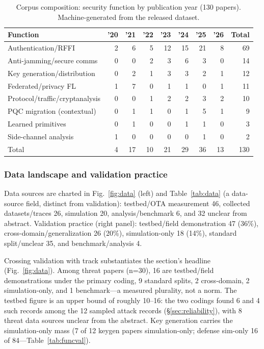 \begin{table}[tbp]
\centering
\caption{Corpus composition: security function by publication year (130 papers). Machine-generated from the released dataset.}
\label{tab:functions}
\begin{tabular}{lrrrrrrrr}
\toprule
Function & '20 & '21 & '22 & '23 & '24 & '25 & '26 & Total \\
\midrule
Authentication/RFFI & 2 & 6 & 5 & 12 & 15 & 21 & 8 & 69 \\
Anti-jamming/secure comms & 0 & 0 & 2 & 3 & 6 & 3 & 0 & 14 \\
Key generation/distribution & 0 & 2 & 1 & 3 & 3 & 2 & 1 & 12 \\
Federated/privacy FL & 1 & 7 & 0 & 1 & 1 & 0 & 1 & 11 \\
Protocol/traffic/cryptanalysis & 0 & 0 & 1 & 2 & 2 & 3 & 2 & 10 \\
PQC migration (contextual) & 0 & 1 & 1 & 0 & 1 & 5 & 1 & 9 \\
Learned primitives & 0 & 1 & 0 & 0 & 1 & 1 & 0 & 3 \\
Side-channel analysis & 1 & 0 & 0 & 0 & 0 & 1 & 0 & 2 \\
Total & 4 & 17 & 10 & 21 & 29 & 36 & 13 & 130 \\
\bottomrule
\end{tabular}
\end{table}

\subsubsection{Data landscape and validation practice}
Data sources are charted in Fig.~\ref{fig:data} (left) and Table~\ref{tab:data} (a data-source field, distinct from validation): testbed/OTA measurement 46, collected datasets/traces 26, simulation 20, analysis/benchmark 6, and 32 unclear from abstract. Validation practice (right panel): testbed/field demonstration 47 (36\%), cross-domain/generalization 26 (20\%), simulation-only 18 (14\%), standard split/unclear 35, and benchmark/analysis 4.

Crossing validation with track substantiates the section's headline (Fig.~\ref{fig:data}). Among threat papers (n=30), 16 are testbed/field demonstrations under the primary coding, 9 standard splits, 2 cross-domain, 2 simulation-only, and 1 benchmark---a measured plurality, not a norm. The testbed figure is an upper bound of roughly 10--16: the two codings found 6 and 4 such records among the 12 sampled attack records (\S\ref{sec:reliability}), with 8 threat data sources unclear from the abstract. Key generation carries the simulation-only mass (7 of 12 keygen papers simulation-only; defense sim-only 16 of 84---Table~\ref{tab:funcval}).

